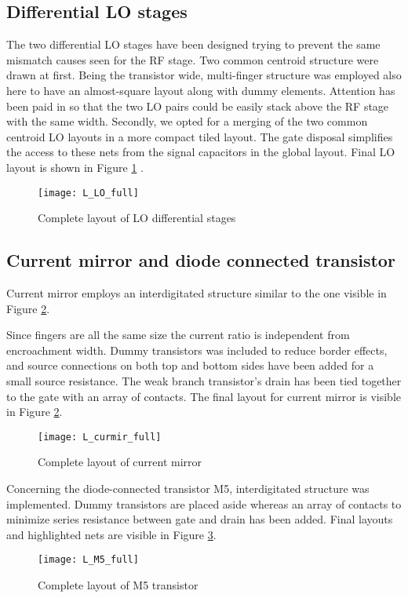\newpage
\subsection{Differential LO stages}
The two differential LO stages have been designed trying to prevent the same mismatch causes seen for the RF stage. Two common centroid structure were drawn at first. Being the transistor wide, multi-finger structure was employed also here to have an almost-square layout along with dummy elements. Attention has been paid in so that the two LO pairs could be easily stack above the RF stage with the same width. 
Secondly, we opted for a merging of the two common centroid LO layouts in a more compact tiled layout. The gate disposal simplifies the access to these nets from the signal capacitors in the global layout. Final LO layout is shown in Figure \ref{L_LO_full} .

\begin{figure}[H]
	\centering
	\texttt{[image: L\_LO\_full]}
	\caption{Complete layout of LO differential stages}
	\label{L_LO_full}
\end{figure}

\subsection{Current mirror and diode connected transistor}
Current mirror employs an interdigitated structure similar to the one visible in Figure \ref{L_curmir_full}.

Since fingers are all the same size the current ratio is independent from encroachment width. Dummy transistors was included to reduce border effects, and source connections on both top and bottom sides have been added for a small source resistance. The weak branch transistor's drain has been tied together to the gate with an array of contacts. The final layout for current mirror is visible in Figure \ref{L_curmir_full}.

\begin{figure}[H]
	\centering
	\texttt{[image: L\_curmir\_full]}
	\caption{Complete layout of current mirror}
	\label{L_curmir_full}
\end{figure}

Concerning the diode-connected transistor M5, interdigitated structure was implemented. Dummy transistors are placed aside whereas an array of contacts to minimize series resistance between gate and drain has been added. Final layouts and highlighted nets are visible in Figure \ref{L_M5_full}. 
\begin{figure}[H]
	\centering
	\texttt{[image: L\_M5\_full]}
	\caption{Complete layout of M5 transistor}
	\label{L_M5_full}
\end{figure}

